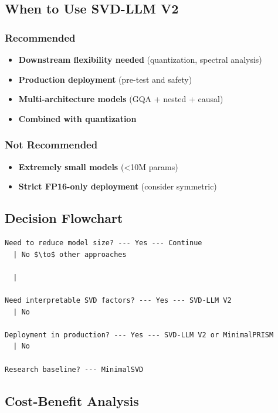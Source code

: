 \subsection{When to Use SVD-LLM V2}

\subsubsection{Recommended}

\begin{itemize}
\item \textbf{Downstream flexibility needed} (quantization, spectral analysis)
\item \textbf{Production deployment} (pre-test and safety)
\item \textbf{Multi-architecture models} (GQA + nested + causal)
\item \textbf{Combined with quantization}

\end{itemize}
\subsubsection{Not Recommended}

\begin{itemize}
\item \textbf{Extremely small models} (<10M params)
\item \textbf{Strict FP16-only deployment} (consider symmetric)

\end{itemize}
\subsection{Decision Flowchart}

\begin{lstlisting}
Need to reduce model size? --- Yes --- Continue
  | No $\to$ other approaches

  |
   
Need interpretable SVD factors? --- Yes --- SVD-LLM V2
  | No
   
Deployment in production? --- Yes --- SVD-LLM V2 or MinimalPRISM
  | No
   
Research baseline? --- MinimalSVD
\end{lstlisting}

\subsection{Cost-Benefit Analysis}

